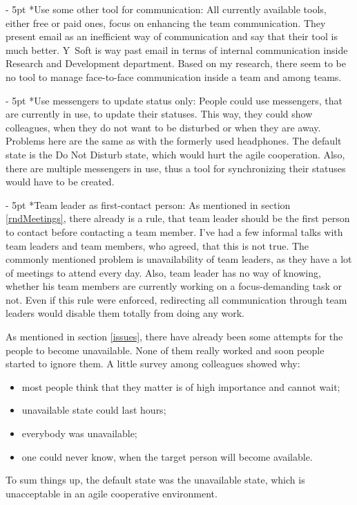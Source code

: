 \documentclass[11pt,singleside]{myfithesis2}
\makeatletter
\renewcommand\paragraph{
   \vspace{-10pt}
   \@startsection{paragraph}{4}{0mm}
      {\baselineskip}
      {- 5pt}
      {\normalfont\normalsize\bfseries}
}
\makeatother
\begin{document}
\paragraph*{Use some other tool for communication: } All currently available tools, either free or paid ones, focus on enhancing the team communication. They present email as an inefficient way of communication and say that their tool is much better. Y~Soft is way past email in terms of internal communication inside Research and Development department. Based on my research, there seem to be no tool to manage face-to-face communication inside a team and among teams.

\paragraph*{Use messengers to update status only: } People could use messengers, that are currently in use, to update their statuses. This way, they could show colleagues, when they do not want to be disturbed or when they are away. Problems here are the same as with the formerly used headphones. The default state is the Do Not Disturb state, which would hurt the agile cooperation. Also, there are multiple messengers in use, thus a tool for synchronizing their statuses would have to be created.

\paragraph*{Team leader as first-contact person: } As mentioned in section \ref{rndMeetings}, there already is a rule, that team leader should be the first person to contact before contacting a team member. I've had a few informal talks with team leaders and team members, who agreed, that this is not true. The commonly mentioned problem is unavailability of team leaders, as they have a lot of meetings to attend every day. Also, team leader has no way of knowing, whether his team members are currently working on a focus-demanding task or not. Even if this rule were enforced, redirecting all communication through team leaders would disable them totally from doing any work.

As mentioned in section \ref{issues}, there have already been some attempts for the people to become unavailable. None of them really worked and soon people started to ignore them. A little survey among colleagues showed why:
\begin{itemize}
	\item most people think that they matter is of high importance and cannot wait;
	\item unavailable state could last hours;
	\item everybody was unavailable;
	\item one could never know, when the target person will become available.
\end{itemize}
To sum things up, the default state was the unavailable state, which is unacceptable in an agile cooperative environment.
\end{document}
